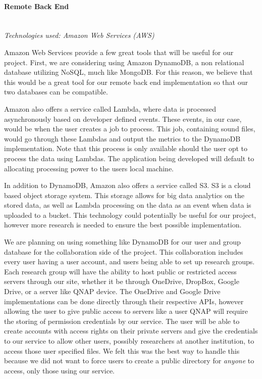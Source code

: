 \paragraph{Remote Back End} \mbox{} \\
\textit{Technologies used: Amazon Web Services (AWS)}\par
Amazon Web Services provide a few great tools that will be useful for our project. First, we are considering using Amazon DynamoDB, a non relational database utilizing NoSQL, much like MongoDB. For this reason, we believe that this would be a great tool for our remote back end implementation so that our two databases can be compatible.\par
Amazon also offers a service called Lambda, where data is processed asynchronously based on developer defined events. These events, in our case, would be when the user creates a job to process. This job, containing sound files, would go through these Lambdas and output the metrics to the DynamoDB implementation. Note that this process is only available should the user opt to process the data using Lambdas. The application being developed will default to allocating processing power to the user\textquotesingle s local machine.\par
In addition to DynamoDB, Amazon also offers a service called S3. S3 is a cloud based object storage system. This storage allows for big data analytics on the stored data, as well as Lambda processing on the data as an event when data is uploaded to a bucket. This technology could potentially be useful for our project, however more research is needed to ensure the best possible implementation.\par
We are planning on using something like DynamoDB for our user and group database for the collaboration side of the project. This collaboration includes every user having a user account, and users being able to set up research groups. Each research group will have the ability to host public or restricted access servers through our site, whether it be through OneDrive, DropBox, Google Drive, or a server like QNAP device. The OneDrive and Google Drive implementations can be done directly through their respective APIs, however allowing the user to give public access to servers like a user QNAP will require the storing of permission credentials by our service. The user will be able to create accounts with access rights on their private servers and give the credentials to our service to allow other users, possibly researchers at another institution, to access those user specified files. We felt this was the best way to handle this because we did not want to force users to create a public directory for \textit{anyone} to access, only those using our service.\par
